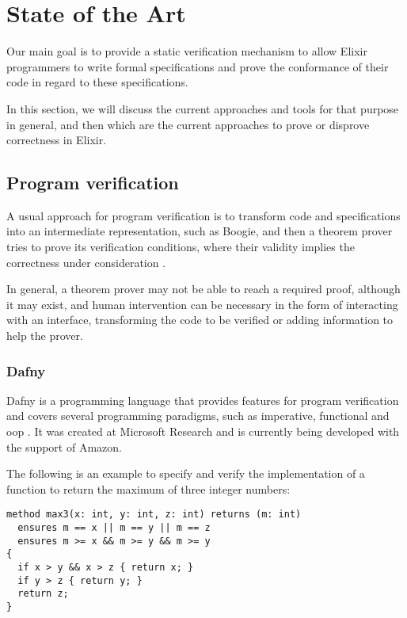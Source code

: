 \chapter{State of the Art}
\label{cap:stateOfTheArt}


Our main goal is to provide a static verification mechanism to allow Elixir
programmers to write formal specifications and prove the conformance of their 
code in regard to these specifications. 

In this section, we will discuss the current approaches and tools for that
purpose in general, and then which are the current approaches to prove or
disprove correctness in Elixir.

\section{Program verification}

A usual approach for program verification is to transform code and
specifications into an intermediate representation, such as Boogie, and then a
theorem prover tries to prove its verification conditions, where their validity
implies the correctness under consideration \citep{Boogie2}.

In general, a theorem prover may not be able to reach a required proof, although
it may exist, and human intervention can be necessary in the form of interacting
with an interface, transforming the code to be verified or adding information to
help the prover.

\subsection{Dafny}

Dafny is a programming language that provides features for program verification
and covers several programming paradigms, such as imperative, functional and
\gls{oop} \citep{DafnyManual}.  It was created at Microsoft Research and is
currently being developed with the support of Amazon.

The following is an example to specify and verify the implementation of a
function to return the maximum of three integer numbers:

\begin{verbatim}
method max3(x: int, y: int, z: int) returns (m: int)
  ensures m == x || m == y || m == z
  ensures m >= x && m >= y && m >= y
{
  if x > y && x > z { return x; }
  if y > z { return y; }
  return z;
}
\end{verbatim}

